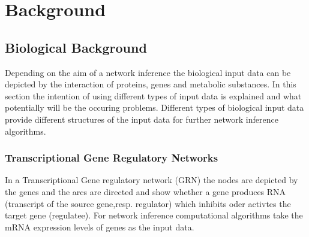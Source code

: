 \chapter{Background}



\section{Biological Background}

Depending on the aim of a network inference the biological input data can be depicted by the interaction of proteins, genes and metabolic substances. In this section the intention of using different types of input data is explained and what potentially will be the occuring problems. Different types of biological input data provide different structures of the input data for further network inference algorithms. 

\newpage

\subsection*{Transcriptional Gene Regulatory Networks}

In a Transcriptional Gene regulatory network (GRN) the nodes are depicted by the genes and the arcs are directed and show whether a gene produces RNA (transcript of the source gene,resp. regulator) which inhibits oder activtes the target gene (regulatee). For network inference computational algorithms take the mRNA expression levels of genes as the input data. %
 
